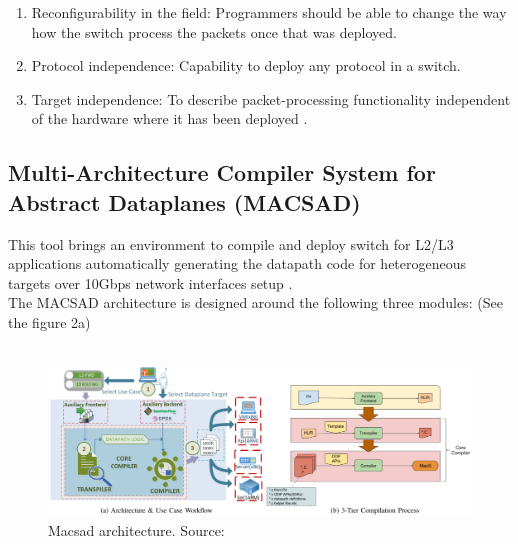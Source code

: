 \begin{enumerate}
\item Reconfigurability in the field: Programmers should be able to change the way how the switch process the packets once that was deployed. 
\item Protocol independence: Capability to deploy any protocol in a switch.  
\item Target independence: To describe packet-processing functionality independent of the hardware where it has been deployed \cite{P4}.
\end{enumerate}

\subsection{Multi-Architecture Compiler System for Abstract Dataplanes (MACSAD)} 
\label{sec:Macsad}
This tool brings an environment to compile and deploy switch for L2/L3 applications automatically generating the datapath code for heterogeneous targets over 10Gbps network interfaces setup \cite{Patra}.\\
The MACSAD architecture is designed around the following three modules: (See the figure 2a) \\ \\
\begin{figure}[!ht]
	\centering
	\includegraphics[width=0.85\linewidth]{figures/macsad_arch.png}
	\caption{Macsad architecture. Source:\cite{Patra}}
	\label{fig:mac_arch}
\end{figure}


